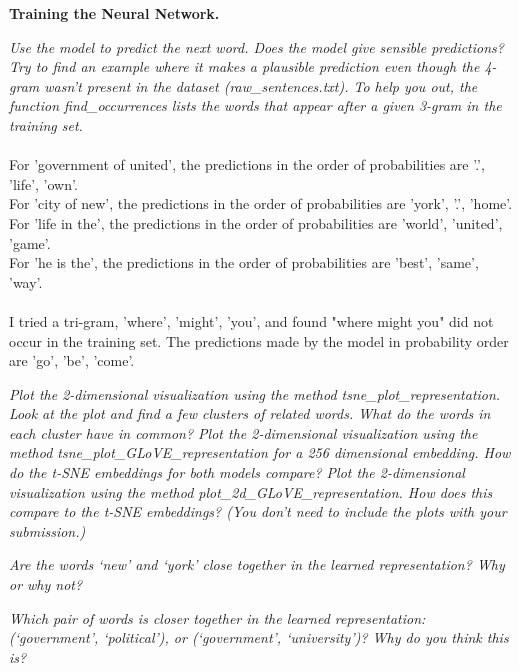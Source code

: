 \documentclass{myhw}
\begin{document}
\begin{homeworkProblem}
\textbf{Training the Neural Network.}
\begin{homeworkSection}
\emph{Use the model to predict the next word. Does the model give sensible predictions? Try to find an example where it makes a plausible prediction even though the 4-gram wasn’t present in the dataset (raw\_sentences.txt). To help you out, the function find\_occurrences lists the words that appear after a given 3-gram in the training set.} \\
\\
For 'government of united', the predictions in the order of probabilities are '.', 'life', 'own'. \\
For 'city of new', the predictions in the order of probabilities are 'york', '.', 'home'.\\
For 'life in the', the predictions in the order of probabilities are 'world', 'united', 'game'.\\
For 'he is the', the predictions in the order of probabilities are 'best', 'same', 'way'. \\
\\
I tried a tri-gram, 'where', 'might', 'you', and found "where might you" did not occur in the training set. The predictions made by the model in probability order are 'go', 'be', 'come'.
\end{homeworkSection}
\begin{homeworkSection}
\emph{Plot the 2-dimensional visualization using the method tsne\_plot\_representation. Look at the plot and find a few clusters of related words. What do the words in each cluster have in common? Plot the 2-dimensional visualization using the method tsne\_plot\_GLoVE\_representation for a 256 dimensional embedding. How do the t-SNE embeddings for both models compare? Plot the 2-dimensional visualization using the method plot\_2d\_GLoVE\_representation. How does this compare to the t-SNE embeddings? (You don’t need to include the plots with your submission.)}
\end{homeworkSection}
\begin{homeworkSection}
\emph{Are the words ‘new’ and ‘york’ close together in the learned representation? Why or why not?}
\end{homeworkSection}
\begin{homeworkSection}
\emph{Which pair of words is closer together in the learned representation: (‘government’, ‘political’), or (‘government’, ‘university’)? Why do you think this is?}
\end{homeworkSection}
\end{homeworkProblem}
\end{document}
